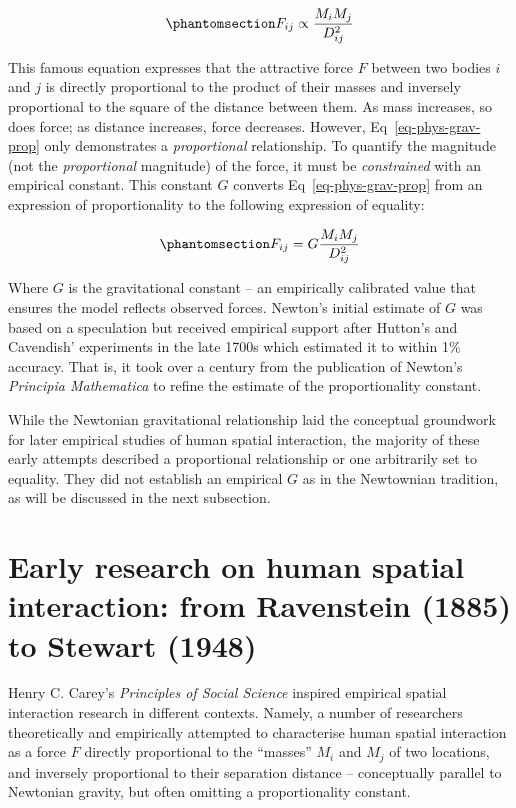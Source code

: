 \documentclass[
  10pt,
  letterpaper,
]{article}
\begin{document}
\begin{equation}\phantomsection\label{eq-phys-grav-prop}{
F_{ij} \propto \frac{M_i M_j} {D_{ij}^{2}}
}\end{equation}

This famous equation expresses that the attractive force \(F\) between
two bodies \(i\) and \(j\) is directly proportional to the product of
their masses and inversely proportional to the square of the distance
between them. As mass increases, so does force; as distance increases,
force decreases. However, Eq~\ref{eq-phys-grav-prop} only demonstrates a
\emph{proportional} relationship. To quantify the magnitude (not the
\emph{proportional} magnitude) of the force, it must be
\emph{constrained} with an empirical constant. This constant \(G\)
converts Eq~\ref{eq-phys-grav-prop} from an expression of
proportionality to the following expression of equality:

\begin{equation}\phantomsection\label{eq-phys-grav}{
F_{ij} = G \frac{M_i M_j} {D_{ij}^{2}}
}\end{equation}

Where \(G\) is the gravitational constant -- an empirically calibrated
value that ensures the model reflects observed forces. Newton's initial
estimate of \(G\) was based on a speculation but received empirical
support after Hutton's and Cavendish' experiments in the late 1700s
\citep{hutton_xxxiii_1778, cavendish_xxi_1798} which estimated it to
within 1\% accuracy. That is, it took over a century from the
publication of Newton's \emph{Principia Mathematica} to refine the
estimate of the proportionality constant.

While the Newtonian gravitational relationship laid the conceptual
groundwork for later empirical studies of human spatial interaction, the
majority of these early attempts described a proportional relationship
or one arbitrarily set to equality. They did not establish an empirical
\(G\) as in the Newtownian tradition, as will be discussed in the next
subsection.

\section{Early research on human spatial interaction: from Ravenstein
(1885) to Stewart
(1948)}\label{early-research-on-human-spatial-interaction-from-ravenstein-1885-to-stewart-1948}

Henry C. Carey's \emph{Principles of Social Science}
\citep{careyPrinciplesSocialScience1858} inspired empirical spatial
interaction research in different contexts. Namely, a number of
researchers theoretically and empirically attempted to characterise
human spatial interaction as a force \(F\) directly proportional to the
``masses'' \(M_i\) and \(M_j\) of two locations, and inversely
proportional to their separation distance -- conceptually parallel to
Newtonian gravity, but often omitting a proportionality constant.
\end{document}
